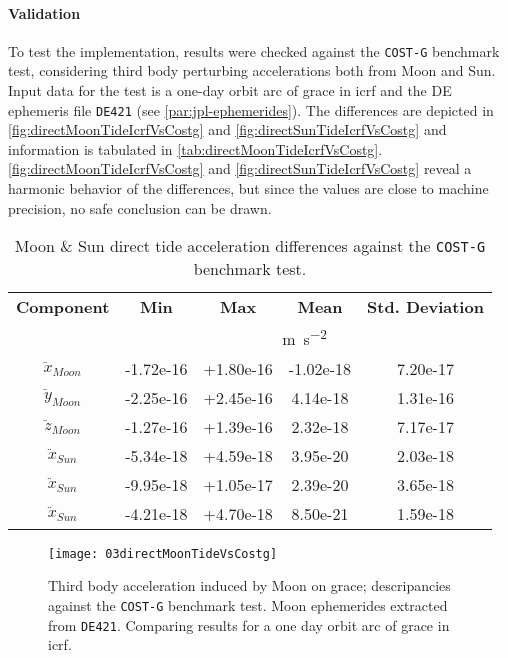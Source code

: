 \paragraph{Validation}\label{sssec:third-body-perurbation-validation}

To test the implementation, results were checked against the \texttt{COST-G} 
benchmark test, considering third body perturbing accelerations both from Moon and Sun. 
Input data for the test is a one-day orbit arc of \gls{grace} in \gls{icrf} and 
the DE ephemeris file \texttt{DE421} (see \autoref{par:jpl-ephemerides}). 
The differences are depicted in \autoref{fig:directMoonTideIcrfVsCostg} and \autoref{fig:directSunTideIcrfVsCostg} 
and information is tabulated in \autoref{tab:directMoonTideIcrfVsCostg}.
\autoref{fig:directMoonTideIcrfVsCostg} and \autoref{fig:directSunTideIcrfVsCostg} reveal a 
harmonic behavior of the differences, but since the values are close to machine precision, 
no safe conclusion can be drawn.

\begin{table}[]
  \centering
  \begin{tabular}{ccccc}
      \textbf{Component} & \textbf{Min} & \textbf{Max} & \textbf{Mean} & \textbf{Std. Deviation}\\
      & \multicolumn{4}{c}{\si{\metre\per\square\second}} \\
      \hline
      $\ddot{x}_{Moon}$ & -1.72e-16 & +1.80e-16 & -1.02e-18 & 7.20e-17 \\ 
      $\ddot{y}_{Moon}$ & -2.25e-16 & +2.45e-16 & 4.14e-18  & 1.31e-16 \\
      $\ddot{z}_{Moon}$ & -1.27e-16 & +1.39e-16 & 2.32e-18  & 7.17e-17 \\
      $\ddot{x}_{Sun}$  & -5.34e-18 & +4.59e-18 & 3.95e-20  & 2.03e-18 \\
      $\ddot{x}_{Sun}$  & -9.95e-18 & +1.05e-17 & 2.39e-20  & 3.65e-18 \\
      $\ddot{x}_{Sun}$  & -4.21e-18 & +4.70e-18 & 8.50e-21  & 1.59e-18 \\
      \hline
  \end{tabular}
  \caption{Moon \& Sun direct tide acceleration differences against the \texttt{COST-G} benchmark test.}
  \label{tab:directMoonTideIcrfVsCostg}
\end{table}

\begin{figure}
  \centering
  \texttt{[image: 03directMoonTideVsCostg]}
  \caption{Third body acceleration induced by Moon on \gls{grace}; descripancies 
   against the \texttt{COST-G} benchmark test. Moon ephemerides extracted from \texttt{DE421}.
   Comparing results for a one day orbit arc of \gls{grace} in \gls{icrf}.}
  \label{fig:directMoonTideIcrfVsCostg}
\end{figure}

